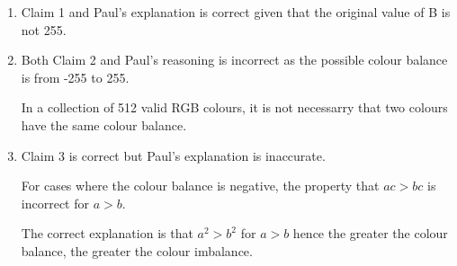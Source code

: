 \documentclass[12pt]{article}
\begin{document}
\begin{enumerate}
\item[Claim 1.]
Claim 1 and Paul's explanation is correct given that the original value of B is not 255.

\item[Claim 2.]
Both Claim 2 and Paul's reasoning is incorrect as the possible colour balance is from -255 to 255.

In a collection of 512 valid RGB colours, it is not necessarry that two colours have the same colour balance.

\item[Claim 3.]
Claim 3 is correct but Paul's explanation is inaccurate.

For cases where the colour balance is negative, the property that
$ac > bc$ is incorrect for $a > b$.

The correct explanation is that $a^2 > b^2$ for $a > b$ hence the greater the colour balance, the greater the colour imbalance.
\end{enumerate}
\end{document}
